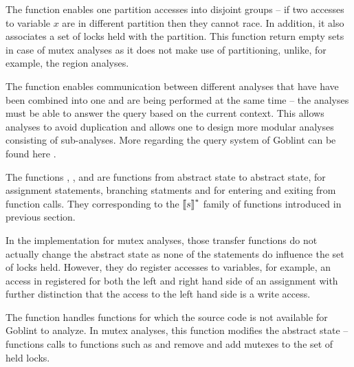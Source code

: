 \documentclass[..thesis.tex]{subfiles}
\begin{document}
The  function enables one partition accesses into disjoint groups -- if two accesses to variable $x$ are in different partition then they cannot race.
In addition, it also associates a set of locks held with the partition. This function return empty sets in case of mutex analyses as it does not make use of partitioning,
unlike, for example, the region analyses.

The  function enables communication between different analyses that have have been combined into one and are being performed at the same time -- 
the analyses must be able to answer the query based on the current context. This allows analyses to avoid duplication and allows one to design more modular analyses consisting of sub-analyses. More regarding the query system of Goblint can be found here .

The functions , ,  and  are functions from abstract state to abstract state, for assignment statements,
branching statments and for entering and exiting from function calls. They corresponding to the $\left\llbracket s \right\rrbracket^{*}$ family of functions introduced in previous section.


In the implementation for mutex analyses, those transfer functions do not actually change the abstract state as none of the statements do influence the set of locks held.
However, they do register accesses to variables, for example, an access in registered for both the left and right hand side of an assignment with further distinction
that the access to the left hand side is a write access.

The  function handles functions for which the source code is not available for Goblint to analyze. In mutex analyses,
this function modifies the abstract state -- functions calls to functions such as  and  
remove and add mutexes to the set of held locks.


\end{document}
